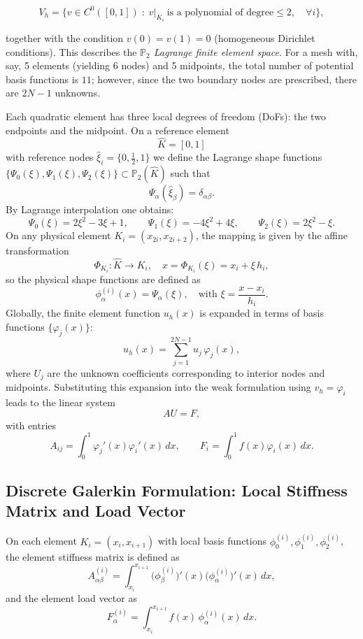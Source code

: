 \documentclass{article}
\begin{document}
\[
	V_h=\{v\in C^0([0,1])\;:\; v|_{K_i}\ \text{is a polynomial of degree}\le2,\quad\forall i\},
\]

together with the condition \(v(0)=v(1)=0\) (homogeneous Dirichlet conditions).
This describes the \emph{\(\mathbb{P}_2\) Lagrange finite element space}.
For a mesh with, say, 5 elements (yielding 6 nodes) and 5 midpoints, the total number of potential basis functions is \(11\);
however, since the two boundary nodes are prescribed, there are \(2N-1\) unknowns.

Each quadratic element has three local degrees of freedom (DoFs): the two endpoints and the midpoint.
On a reference element
\[
	\hat{K}=[0,1]
\]
with reference nodes \(\hat{\xi}_i=\{0,\tfrac{1}{2},1\}\) we define the Lagrange shape functions \(\{\Psi_0(\xi),\Psi_1(\xi),\Psi_2(\xi)\}\subset \mathbb{P}_2(\hat{K})\) such that
\[
	\Psi_\alpha(\hat{\xi}_\beta)=\delta_{\alpha\beta}.
\]
By Lagrange interpolation one obtains:
\[
	\Psi_0(\xi)=2\xi^2-3\xi+1,\qquad \Psi_1(\xi)=-4\xi^2+4\xi,\qquad \Psi_2(\xi)=2\xi^2-\xi.
\]
On any physical element \(K_i=(x_{2i},x_{2i+2})\), the mapping is given by the affine transformation
\[
	\Phi_{K_i}:\hat{K}\to K_i,\quad x=\Phi_{K_i}(\xi)=x_i+\xi\,h_i,
\]
so the physical shape functions are defined as
\[
	\phi_\alpha^{(i)}(x)=\Psi_\alpha(\xi),\quad \text{with } \xi=\frac{x-x_i}{h_i}.
\]
Globally, the finite element function \(u_h(x)\) is expanded in terms of basis functions \(\{\varphi_j(x)\}\):
\[
	u_h(x)=\sum_{j=1}^{2N-1} u_j\,\varphi_j(x),
\]
where \(U_j\) are the unknown coefficients corresponding to interior nodes and midpoints. Substituting this expansion into the weak formulation using \(v_h=\varphi_i\) leads to the linear system
\[
	AU=F,
\]
with entries
\[
	A_{ij}=\int_0^1\varphi_j'(x)\varphi_i'(x)\,dx,\qquad F_i=\int_0^1 f(x)\varphi_i(x)\,dx.
\]

\subsection{Discrete Galerkin Formulation: Local Stiffness Matrix and Load Vector}

On each element \(K_i=(x_i,x_{i+1})\) with local basis functions \(\phi_0^{(i)},\phi_1^{(i)},\phi_2^{(i)}\), the element stiffness matrix is defined as
\[
	A^{(i)}_{\alpha\beta}=\int_{x_i}^{x_{i+1}} \big(\phi_\beta^{(i)}\big)'(x) \big(\phi_\alpha^{(i)}\big)'(x)\,dx,
\]
and the element load vector as
\[
	F^{(i)}_\alpha=\int_{x_i}^{x_{i+1}} f(x)\,\phi_\alpha^{(i)}(x)\,dx.
\]
\end{document}
